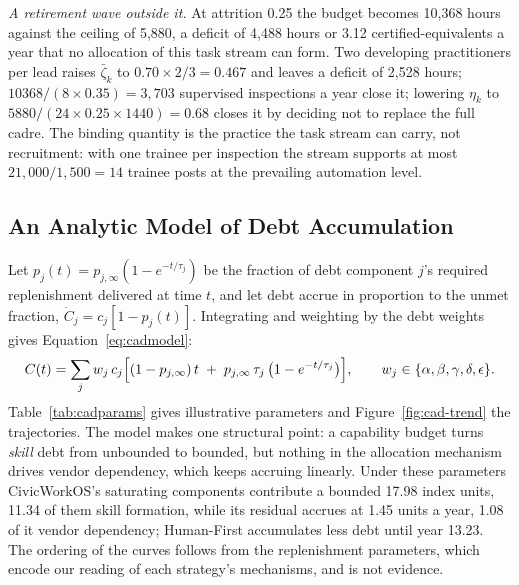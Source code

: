\documentclass[utf8]{frontiers_suppmat}
\begin{document}
\textit{A retirement wave outside it.} At attrition 0.25 the budget becomes 10{,}368 hours against the ceiling of 5{,}880, a deficit of 4{,}488 hours or 3.12 certified-equivalents a year that no allocation of this task stream can form. Two developing practitioners per lead raises $\bar\zeta_k$ to $0.70\times2/3=0.467$ and leaves a deficit of 2{,}528 hours; $10368/(8\times0.35)=3{,}703$ supervised inspections a year close it; lowering $\eta_k$ to $5880/(24\times0.25\times1440)=0.68$ closes it by deciding not to replace the full cadre. The binding quantity is the practice the task stream can carry, not recruitment: with one trainee per inspection the stream supports at most $21{,}000/1{,}500=14$ trainee posts at the prevailing automation level.

\subsection{An Analytic Model of Debt Accumulation}
\label{app:cadmodel}

Let $p_j(t)=p_{j,\infty}(1-e^{-t/\tau_j})$ be the fraction of debt component $j$'s required replenishment delivered at time $t$, and let debt accrue in proportion to the unmet fraction, $\dot C_j=c_j[1-p_j(t)]$. Integrating and weighting by the debt weights gives Equation~\eqref{eq:cadmodel}:
\begin{equation}
	C(t) = \sum_{j} w_j\, c_j \Bigl[(1-p_{j,\infty})\,t \;+\; p_{j,\infty}\,\tau_j\,\bigl(1-e^{-t/\tau_j}\bigr)\Bigr],
	\qquad w_j\in\{\alpha,\beta,\gamma,\delta,\epsilon\}.
	\label{eq:cadmodel}
\end{equation}
Table~\ref{tab:cadparams} gives illustrative parameters and Figure~\ref{fig:cad-trend} the trajectories. The model makes one structural point: a capability budget turns \textit{skill} debt from unbounded to bounded, but nothing in the allocation mechanism drives vendor dependency, which keeps accruing linearly. Under these parameters CivicWorkOS's saturating components contribute a bounded 17.98 index units, 11.34 of them skill formation, while its residual accrues at 1.45 units a year, 1.08 of it vendor dependency; Human-First accumulates less debt until year 13.23. The ordering of the curves follows from the replenishment parameters, which encode our reading of each strategy's mechanisms, and is not evidence.
\end{document}
